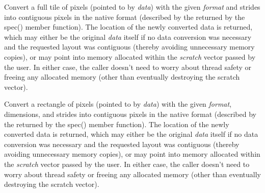 
Convert a full tile of pixels (pointed to by \emph{data}) with the given
\emph{format} and strides into contiguous pixels in the native format
(described by the \ImageSpec returned by the {\cf spec()} member
function).  The location of the newly converted data is returned, which
may either be the original \emph{data} itself if no data conversion was
necessary and the requested layout was contiguous (thereby avoiding
unnecessary memory copies), or may point into memory allocated within
the \emph{scratch} vector passed by the user.  In either case, the
caller doesn't need to worry about thread safety or freeing any
allocated memory (other than eventually destroying the scratch vector).

\apiend


Convert a rectangle of pixels (pointed to by \emph{data}) with the given
\emph{format}, dimensions, and strides into contiguous pixels in the
native format (described by the \ImageSpec returned by the {\cf spec()}
member function).  The location of the newly converted data is returned,
which may either be the original \emph{data} itself if no data
conversion was necessary and the requested layout was contiguous
(thereby avoiding unnecessary memory copies), or may point into memory
allocated within the \emph{scratch} vector passed by the user.  In
either case, the caller doesn't need to worry about thread safety or
freeing any allocated memory (other than eventually destroying the
scratch vector).

\apiend

